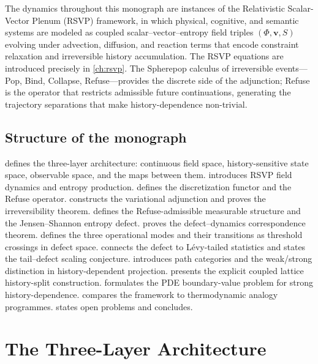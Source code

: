 \documentclass[12pt, oneside]{memoir}
\newcommand{\bv}{\mathbf{v}}
\begin{document}
The dynamics throughout this monograph are instances of the Relativistic Scalar-Vector
Plenum (RSVP) framework, in which physical, cognitive, and semantic systems are modeled
as coupled scalar--vector--entropy field triples $(\Phi, \bv, S)$ evolving under
advection, diffusion, and reaction terms that encode constraint relaxation and irreversible
history accumulation.  The RSVP equations are introduced precisely in
\cref{ch:rsvp}.  The Spherepop calculus of irreversible events---Pop, Bind, Collapse,
Refuse---provides the discrete side of the adjunction; Refuse is the operator that
restricts admissible future continuations, generating the trajectory separations that make
history-dependence non-trivial.

\section{Structure of the monograph}

 defines the three-layer architecture: continuous field space,
history-sensitive state space, observable space, and the maps between them.
 introduces RSVP field dynamics and entropy production.
 defines the discretization functor and the Refuse operator.
 constructs the variational adjunction and proves the irreversibility
theorem.
 defines the Refuse-admissible measurable structure and the Jensen--Shannon
entropy defect.
 proves the defect--dynamics correspondence theorem.
 defines the three operational modes and their transitions as threshold
crossings in defect space.
 connects the defect to Lévy-tailed statistics and states the tail--defect
scaling conjecture.
 introduces path categories and the weak/strong distinction in
history-dependent projection.
 presents the explicit coupled lattice history-split construction.
 formulates the PDE boundary-value problem for strong history-dependence.
 compares the framework to thermodynamic analogy programmes.
 states open problems and concludes.

\chapter{The Three-Layer Architecture}
\label{ch:architecture}
\end{document}
